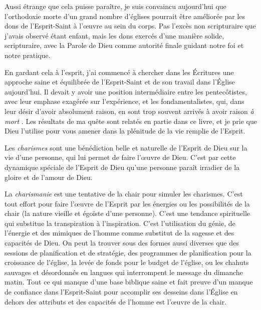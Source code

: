 Aussi étrange que cela puisse paraître, je suis convaincu aujour\-d'hui que
 l'orthodoxie morte d'un grand nombre d'églises pourrait être améliorée par les
 dons de l'Esprit-Saint à l'œuvre au sein du corps. Pas l'excès non scripturaire que
 j'avais observé étant enfant, mais les dons exercés d'une manière solide,
 scripturaire, avec la Parole de Dieu comme autorité finale guidant notre foi et
 notre pratique.

\begin{specialpar}{}
En gardant cela à l'esprit, j'ai commencé à chercher dans les Écritures une
 approche saine et équilibrée de l'Esprit-Saint et de son travail dans l'Église
 aujourd'hui. Il devait y avoir une position inter\-mé\-di\-aire entre les
 pentecôtistes, avec leur emphase exagérée sur l'ex\-pé\-rience, et les
 fondamentalistes, qui, dans leur désir d'avoir absolument raison,
 en sont trop souvent arrivés à avoir raison \emph{à mort}
 .
 Les résultats de ma quête sont relatés en partie dans ce livre, et je prie que
 Dieu l'utilise pour vous amener dans la plénitude de la vie remplie de
 l'Esprit.
\end{specialpar}

Les \emph{charismes} sont une bénédiction belle et naturelle de l'Esprit de Dieu
 sur la vie d'une personne, qui lui permet de faire l'œuvre de Dieu. C'est par
 cette dynamique spéciale de l'Esprit de Dieu qu'une personne paraît irradier de
 la gloire et de l'amour de Dieu.

La \emph{charismanie} est une tentative de la chair pour simuler les charismes.
 C'est tout effort pour faire l'œuvre de l'Esprit par les énergies ou les
 possibilités de la chair (la nature vieille et égoïste d'une personne). C'est
 une tendance spirituelle qui substitue la transpiration à l'inspiration. C'est
 l'utilisation du génie, de l'énergie et des mimiques de l'homme comme substitut
 de la sagesse et des capacités de Dieu. On peut la trouver sous des formes
 aussi diverses que des sessions de planification et de stratégie, des
 programmes de planification pour la croissance de l'église, la levée de fonds
 pour le budget de l'église, ou les chahuts sauvages et désordonnés en langues
 qui interrompent le message du dimanche matin. Tout ce qui manque d'une base
 biblique saine et fait preuve d'un manque de confiance dans l'Esprit-Saint pour
 accomplir ses desseins dans l'Église en dehors des attributs et des capacités
 de l'homme est l'œuvre de la chair.


